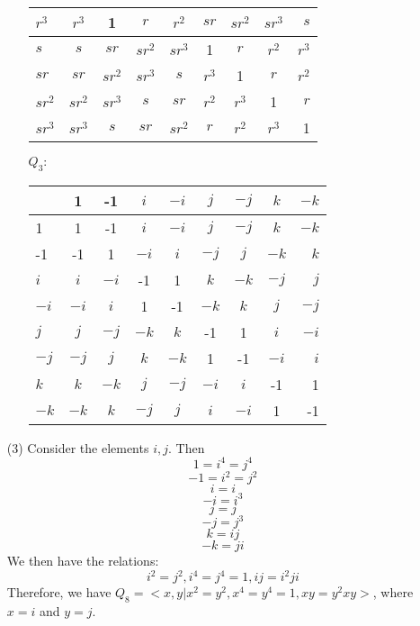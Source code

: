 \documentclass[12pt]{article}
\begin{document}
\begin{itemize}
\begin{itemize}
\begin{tabular}{| l || c | c | c | c | c | c | c | r |}
$r^3$ & $r^3$ & 1 & $r$ & $r^2$ & $sr$ & $sr^2$ & $sr^3$ & $s$ \\
\hline
$s$ & $s$ & $sr$ & $sr^2$ & $sr^3$ & 1 & $r$ & $r^2$ & $r^3$ \\
\hline
$sr$ & $sr$ & $sr^2$ & $sr^3$ & $s$ & $r^3$ & 1 & $r$ & $r^2$ \\
\hline
$sr^2$ & $sr^2$ & $sr^3$ & $s$ & $sr$ & $r^2$ & $r^3$ & 1 & $r$ \\
\hline
$sr^3$ & $sr^3$ & $s$ & $sr$ & $sr^2$ & $r$ & $r^2$ & $r^3$ & 1 \\
\hline
\end{tabular}
\item[$Q_3:$]
\begin{tabular}{| l || c | c | c | c | c | c | c | r |}
\hline
& 1 & -1 & $i$ & $-i$ & $j$ & $-j$ & $k$ & $-k$ \\
\hline
\hline
1 & 1 & -1 & $i$ & $-i$ & $j$ & $-j$ & $k$ & $-k$ \\
\hline
-1 & -1 & 1 & $-i$ & $i$ & $-j$ & $j$ & $-k$ & $k$ \\
\hline
$i$ & $i$ & $-i$ & -1 & 1 & $k$ & $-k$ & $-j$ & $j$ \\
\hline
$-i$ & $-i$ & $i$ & 1 & -1 & $-k$ & $k$ & $j$ & $-j$ \\
\hline
$j$ & $j$ & $-j$ & $-k$ & $k$ & -1 & 1 & $i$ & $-i$ \\
\hline
$-j$ & $-j$ & $j$ & $k$ & $-k$ & 1 & -1 & $-i$ & $i$ \\
\hline
$k$ & $k$ & $-k$ & $j$ & $-j$ & $-i$ & $i$ & -1 & 1 \\
\hline
$-k$ & $-k$ & $k$ & $-j$ & $j$ & $i$ & $-i$ & 1 & -1 \\
\hline
\end{tabular}
\end{itemize}
\item[(3)]
Consider the elements $i, j$. Then
$$1 = i^4 = j^4$$
$$-1 = i^2 = j^2$$
$$i = i$$
$$-i = i^3$$
$$j = j$$
$$-j = j^3$$
$$k = ij$$
$$-k = ji$$
We then have the relations:
$$i^2 = j^2, i^4 = j^4 = 1, ij = i^2ji$$
Therefore, we have
$Q_8 = <x , y | x^2 = y^2, x^4 = y^4 = 1, xy = y^2xy >$, where $x = i$ and $y = j$.
\end{itemize}
\end{document}
